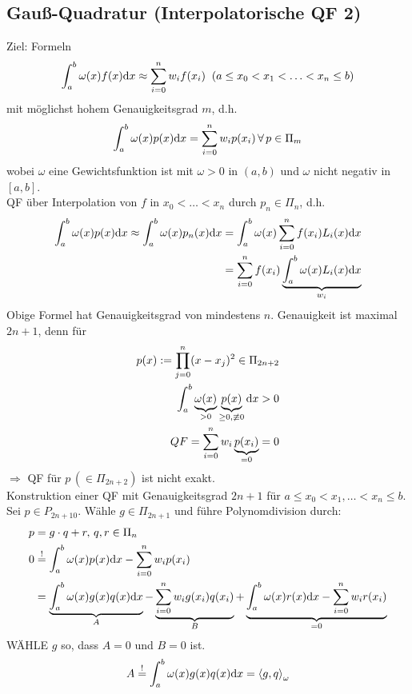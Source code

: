 \subsection{Gauß-Quadratur (Interpolatorische QF 2)}
Ziel: Formeln
\begin{align*}
  \int_a^b \omega(x) f(x) \mathrm{d}x \approx \sum\limits_{i=0}^{n}{w_i f(x_i)}\;\;(a \leq x_0 < x_1 < \ldots < x_n \leq b)
\end{align*}
mit möglichst hohem Genauigkeitsgrad $m$, d.h. 
\begin{align*}
  \int_a^b \omega(x) p(x) \mathrm{d}x = \sum\limits_{i=0}^{n}{w_i p(x_i)}\,\forall\, p \in \Pi_m
\end{align*}
wobei $\omega$ eine Gewichtsfunktion ist mit $\omega > 0$ in $(a,b)$ und $\omega$ nicht negativ in $[a,b]$.\\
QF über Interpolation von $f$ in $x_0 < \ldots < x_n$ durch $p_n \in \Pi_n$, d.h.
\begin{align*}
  \int_a^b \omega(x) p(x) \mathrm{d}x \approx \int_a^b \omega(x) p_n(x) \mathrm{d}x &= \int_a^b \omega(x) \sum\limits_{i=0}^{n}{f(x_i)L_i(x) \mathrm{d}x} \\
  &= \sum\limits_{i=0}^{n}{ f(x_i) \underbrace{\int_a^b \omega(x) L_i(x) \mathrm{d}x}_{w_i}}
\end{align*}
Obige Formel hat Genauigkeitsgrad von mindestens $n$. Genauigkeit ist maximal $2n+1$, denn für
\begin{align*}
  p(x) := \prod_{j=0}^n (x-x_j)^2 \in \Pi_{2n+2} \\
  \int_a^b \underbrace{\omega(x)}_{>0} \underbrace{p(x)}_{\geq 0,\not \equiv 0} \mathrm{d}x > 0\\
  QF = \sum\limits_{i=0}^{n}{w}_i \underbrace{p(x_i)}_{=0} = 0
\end{align*}
$\Rightarrow$ QF für $p\,(\in \Pi_{2n+2})$ ist nicht exakt.\\
Konstruktion einer QF mit Genauigkeitsgrad $2n+1$ für $a \leq x_0 < x_1, \ldots < x_n \leq b$.
Sei $p \in P_{2n+10}$. Wähle $g \in \Pi_{2n+1}$ und führe Polynomdivision durch:
\begin{align*}
  p &= g \cdot q + r,\, q,r \in \Pi_n\\
  0 &\overset{!}{=} \int_a^b \omega(x) p(x) \mathrm{d}x - \sum\limits_{i=0}^{n}{w_i p(x_i)} \\
  &= \underbrace{\int_a^b \omega(x) g(x) q(x) \mathrm{d}x}_{A} - \underbrace{\sum\limits_{i=0}^{n}{w_i g(x_i) q(x_i)}}_{B} + \underbrace{ \int_a^b \omega(x) r(x) \mathrm{d}x - \sum\limits_{i=0}^{n}{w_i r(x_i)}}_{=0}
\end{align*}
WÄHLE $g$ so, dass $A=0$ und $B=0$ ist.
\begin{align*}
  A \overset{!}{=} \int_a^b \omega(x) g(x) q(x) \mathrm{d}x = \left\langle g, q \right\rangle_\omega
\end{align*}
